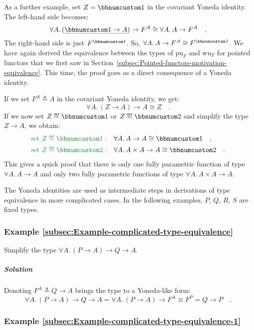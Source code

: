As a further example, set $Z=\bbnum 1$ in the covariant Yoneda identity.
The left-hand side becomes:
\[
\forall A.\,(\gunderline{\bbnum 1\rightarrow A})\rightarrow F^{A}\cong\forall A.\,A\rightarrow F^{A}\quad.
\]
The right-hand side is just $F^{\bbnum 1}$. So, $\forall A.\,A\rightarrow F^{A}\cong F^{\bbnum 1}$.
We have again derived the equivalence between the types of $\text{pu}_{F}$
and $\text{wu}_{F}$ for pointed functors that we first saw in Section~\ref{subsec:Pointed-functors-motivation-equivalence}.
This time, the proof goes as a direct consequence of a Yoneda identity.

If we set $F^{A}\triangleq A$ in the covariant Yoneda identity, we
get:
\[
\forall A.\,(Z\rightarrow A)\rightarrow A\cong Z\quad.
\]
If we now set $Z\triangleq\bbnum 1$ or $Z\triangleq\bbnum 2$ and
simplify the type $Z\rightarrow A$, we obtain:
\begin{align*}
{\color{greenunder}\text{set }Z\triangleq\bbnum 1:}\quad & \forall A.\,A\rightarrow A\cong\bbnum 1\quad,\\
{\color{greenunder}\text{set }Z\triangleq\bbnum 2:}\quad & \forall A.\,A\times A\rightarrow A\cong\bbnum 2\quad.
\end{align*}
This gives a quick proof that there is only one fully parametric function
of type $\forall A.\,A\rightarrow A$ and only two fully parametric
functions of type $\forall A.\,A\times A\rightarrow A$.

The Yoneda identities are used as intermediate steps in derivations
of type equivalence in more complicated cases. In the following examples,
$P$, $Q$, $R$, $S$ are fixed types.

\subsubsection{Example \label{subsec:Example-complicated-type-equivalence}\ref{subsec:Example-complicated-type-equivalence}}

Simplify the type $\forall A.\,(P\rightarrow A)\rightarrow Q\rightarrow A$.

\subparagraph{Solution}

Denoting $F^{A}\triangleq Q\rightarrow A$ brings the type to a Yoneda-like
form:
\[
\forall A.\,(P\rightarrow A)\rightarrow Q\rightarrow A=\forall A.\,(P\rightarrow A)\rightarrow F^{A}\cong F^{P}=Q\rightarrow P\quad.
\]


\subsubsection{Example \label{subsec:Example-complicated-type-equivalence-1}\ref{subsec:Example-complicated-type-equivalence-1}}

